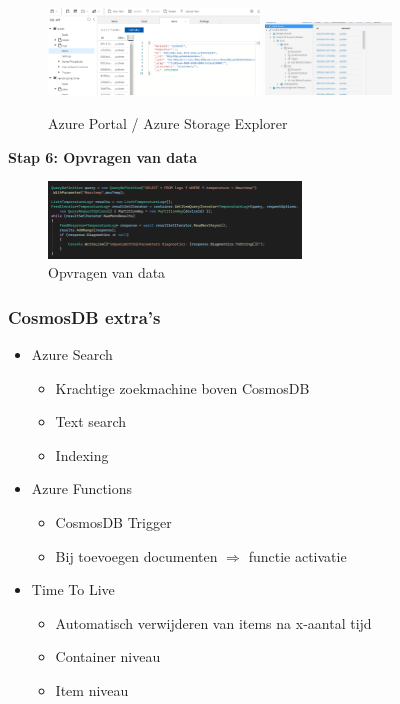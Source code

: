 \documentclass{article}
\newcommand{\bold}[1]{\textbf{#1}}
\begin{document}
\begin{figure}[H]
    \centering
    \includegraphics[width=0.5\textwidth]{cosmosdb-stap5-1.png}
    \includegraphics[width=0.3\textwidth]{cosmosdb-stap5-2.png}
    \caption{Azure Portal / Azure Storage Explorer}
\end{figure}

\bold{Stap 6: Opvragen van data}

\begin{figure}[H]
    \centering
    \includegraphics[width=0.6\textwidth]{cosmosdb-stap6.png}
    \caption{Opvragen van data}
\end{figure}

\subsubsection{CosmosDB extra's}

\begin{itemize}
    \item Azure Search
    \begin{itemize}
        \item Krachtige zoekmachine boven CosmosDB
        \item Text search
        \item Indexing
    \end{itemize}
    \item Azure Functions
    \begin{itemize}
        \item CosmosDB Trigger
        \item Bij toevoegen documenten $\Rightarrow$ functie activatie
    \end{itemize}
    \item Time To Live
    \begin{itemize}
        \item Automatisch verwijderen van items na x-aantal tijd
        \item Container niveau
        \item Item niveau
    \end{itemize}
\end{itemize}
\end{document}
